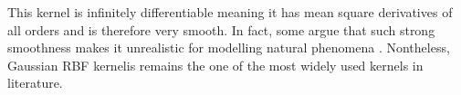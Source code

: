 



This kernel is infinitely differentiable meaning it has mean square derivatives of all orders and is therefore very smooth. In fact, some argue that such strong smoothness makes it unrealistic for modelling natural phenomena \cite{RasmussenCarlEdward2006Gpfm,SteinMichaelL1999IoSD}. Nontheless, Gaussian RBF kernelis remains the one of the most widely used kernels in literature.